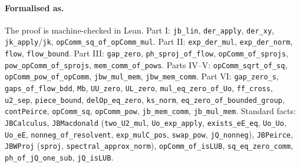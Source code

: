 \documentclass[11pt]{article}
\theoremstyle{remark}
\begin{document}
\paragraph{Formalised as.}
{\raggedright The proof is machine-checked in Lean. Part I: \texttt{jb\_lin}, \texttt{der\_apply},
\texttt{der\_xy}, \texttt{jk\_apply}/\texttt{jk}, \texttt{opComm\_sq\_of\_opComm\_mul}.
Part II: \texttt{exp\_der\_mul}, \texttt{exp\_der\_norm}, \texttt{flow},
\texttt{flow\_bound}. Part III: \texttt{gap\_zero}, \texttt{ph\_sproj\_of\_flow},
\texttt{opComm\_of\_sprojs}, \texttt{pow\_opComm\_of\_sprojs}, \texttt{mem\_comm\_of\_pows}.
Parts IV--V: \texttt{opComm\_sqrt\_of\_sq}, \texttt{opComm\_pow\_of\_opComm},
\texttt{jbw\_mul\_mem}, \texttt{jbw\_mem\_comm}. Part VI: \texttt{gap\_zero\_s},
\texttt{gaps\_of\_flow\_bdd}, \texttt{Mb}, \texttt{UU\_zero}, \texttt{UL\_zero},
\texttt{mul\_eq\_zero\_of\_Uo}, \texttt{ff\_cross}, \texttt{u2\_sep},
\texttt{piece\_bound}, \texttt{delOp\_eq\_zero}, \texttt{ks\_norm},
\texttt{eq\_zero\_of\_bounded\_group}, \texttt{contPeirce}, \texttt{opComm\_sq},
\texttt{opComm\_pow}, \texttt{jb\_mem\_comm}, \texttt{jb\_mul\_mem}.
Standard facts: \texttt{JBCalculus}, \texttt{JBMacdonald} (\texttt{two\_U2\_mul},
\texttt{Uo\_exp\_apply}, \texttt{exists\_eE\_eq}, \texttt{Uo\_Uo}, \texttt{Uo\_eE},
\texttt{nonneg\_of\_resolvent}, \texttt{exp\_mulC\_pos}, \texttt{swap\_pow},
\texttt{jQ\_nonneg}), \texttt{JBPeirce}, \texttt{JBWProj} (\texttt{sproj},
\texttt{spectral\_approx\_norm}), \texttt{opComm\_of\_isLUB},
\texttt{sq\_eq\_zero\_comm}, \texttt{ph\_of\_jQ\_one\_sub}, \texttt{jQ\_isLUB}.\par}
\end{document}
